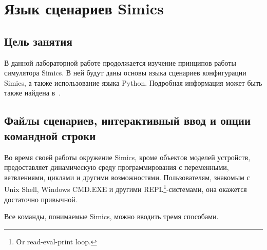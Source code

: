 \chapter{Язык сценариев Simics}\label{chap:scripting}

\section{Цель занятия}

В данной лабораторной работе продолжается изучение принципов работы симулятора Simics. В ней будут даны основы языка сценариев конфигурации Simics, а также использование языка Python. 
Подробная информация может быть также найдена в~\cite{hindsight}.

\section[Файлы, интерактивный ввод и опции]{Файлы сценариев, интерактивный ввод и опции командной строки}

Во время своей работы окружение Simics, кроме объектов моделей устройств, предоставляет динамическую среду программирования с переменными, ветвлениями, циклами и другими возможностями. Пользователям, знакомым с Unix Shell, Windows CMD.EXE и другими REPL\footnote{От \abbr read-eval-print loop.}-системами, она окажется достаточно привычной.

Все команды, понимаемые Simics, можно вводить тремя способами.

